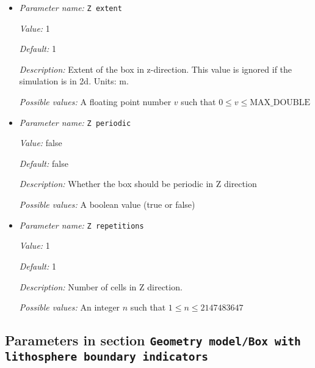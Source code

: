 \begin{itemize}
{\it Value:} 1


{\it Default:} 1


{\it Description:} Number of cells in Y direction.


{\it Possible values:} An integer $n$ such that $1\leq n \leq 2147483647$
\item {\it Parameter name:} {\tt Z extent}
\label{parameters:Geometry model/Box/Z extent}


{\it Value:} 1


{\it Default:} 1


{\it Description:} Extent of the box in z-direction. This value is ignored if the simulation is in 2d. Units: m.


{\it Possible values:} A floating point number $v$ such that $0 \leq v \leq \text{MAX\_DOUBLE}$
\item {\it Parameter name:} {\tt Z periodic}
\label{parameters:Geometry model/Box/Z periodic}


{\it Value:} false


{\it Default:} false


{\it Description:} Whether the box should be periodic in Z direction


{\it Possible values:} A boolean value (true or false)
\item {\it Parameter name:} {\tt Z repetitions}
\label{parameters:Geometry model/Box/Z repetitions}


{\it Value:} 1


{\it Default:} 1


{\it Description:} Number of cells in Z direction.


{\it Possible values:} An integer $n$ such that $1\leq n \leq 2147483647$
\end{itemize}

\subsection{Parameters in section \tt Geometry model/Box with lithosphere boundary indicators}
\label{parameters:Geometry_20model/Box_20with_20lithosphere_20boundary_20indicators}

